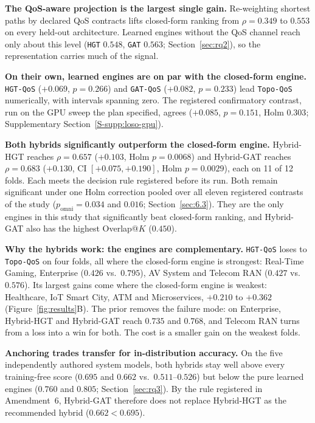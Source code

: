\documentclass[preprint,3p]{elsarticle}
\begin{document}
\noindent\textbf{The QoS-aware projection is the largest single gain.} Re-weighting shortest paths by declared QoS contracts lifts closed-form ranking from $\rho = 0.349$ to $0.553$ on every held-out architecture. Learned engines without the QoS channel reach only about this level (\texttt{HGT} $0.548$, \texttt{GAT} $0.563$; Section~\ref{sec:rq2}), so the representation carries much of the signal.

\noindent\textbf{On their own, learned engines are on par with the closed-form engine.} \texttt{HGT-QoS} ($+0.069$, $p = 0.266$) and \texttt{GAT-QoS} ($+0.082$, $p = 0.233$) lead \texttt{Topo-QoS} numerically, with intervals spanning zero. The registered confirmatory contrast, run on the GPU sweep the plan specified, agrees ($+0.085$, $p = 0.151$, Holm $0.303$; Supplementary Section~\ref{S-supp:loso-gpu}).

\noindent\textbf{Both hybrids significantly outperform the closed-form engine.} Hybrid-HGT reaches $\rho = 0.657$ ($+0.103$, Holm $p = 0.0068$) and Hybrid-GAT reaches $\rho = 0.683$ ($+0.130$, CI $[+0.075, +0.190]$, Holm $p = 0.0029$), each on 11 of 12 folds. Each meets the decision rule registered before its run. Both remain significant under one Holm correction pooled over all eleven registered contrasts of the study ($p_{\text{omni}} = 0.034$ and $0.016$; Section~\ref{sec:6.3}). They are the only engines in this study that significantly beat closed-form ranking, and Hybrid-GAT also has the highest Overlap@$K$ ($0.450$).

\noindent\textbf{Why the hybrids work: the engines are complementary.} \texttt{HGT-QoS} loses to \texttt{Topo-QoS} on four folds, all where the closed-form engine is strongest: Real-Time Gaming, Enterprise ($0.426$ vs.\ $0.795$), AV System and Telecom RAN ($0.427$ vs.\ $0.576$). Its largest gains come where the closed-form engine is weakest: Healthcare, IoT Smart City, ATM and Microservices, $+0.210$ to $+0.362$ (Figure~\ref{fig:results}B). The prior removes the failure mode: on Enterprise, Hybrid-HGT and Hybrid-GAT reach $0.735$ and $0.768$, and Telecom RAN turns from a loss into a win for both. The cost is a smaller gain on the weakest folds.

\noindent\textbf{Anchoring trades transfer for in-distribution accuracy.} On the five independently authored system models, both hybrids stay well above every training-free score ($0.695$ and $0.662$ vs.\ $0.511$--$0.526$) but below the pure learned engines ($0.760$ and $0.805$; Section~\ref{sec:rq3}). By the rule registered in Amendment~6, Hybrid-GAT therefore does not replace Hybrid-HGT as the recommended hybrid ($0.662 < 0.695$).
\end{document}
